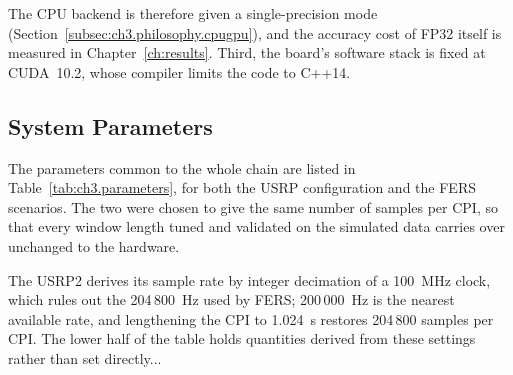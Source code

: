 The CPU backend is therefore given a single-precision mode (Section~\ref{subsec:ch3.philosophy.cpugpu}), and the accuracy cost of FP32 itself is measured in Chapter~\ref{ch:results}. Third, the board's software stack is fixed at CUDA~10.2, whose compiler limits the code to C++14.

\subsection{System Parameters}
\label{subsec:ch3.requirements.parameters}

The parameters common to the whole chain are listed in Table~\ref{tab:ch3.parameters}, for both the USRP configuration and the FERS scenarios. The two were chosen to give the same number of samples per CPI, so that every window length tuned and validated on the simulated data carries over unchanged to the hardware. 

The USRP2 derives its sample rate by integer decimation of a 100~MHz clock, which rules out the 204\,800~Hz used by FERS; 200\,000~Hz is the nearest available rate, and lengthening the CPI to 1.024~s restores 204\,800 samples per CPI. The lower half of the table holds quantities derived from these settings rather than set directly... 

